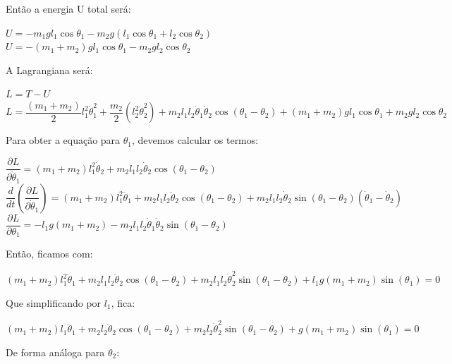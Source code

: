 \documentclass[13pt,a4paper]{report}
\begin{document}
Então a energia U total será:
\begin{center}
$
U = -m_{1}gl_{1}\cos\theta_{1} -m_{2}g ( l_{1}\cos\theta_{1} + l_{2}\cos\theta_{2} )
$
\\[2mm]
$
U = -(m_{1} + m_{2}) gl_{1}\cos\theta_{1} -m_{2}gl_{2}\cos\theta_{2}
$
\end{center}
A Lagrangiana será:
\begin{center}
$
L = T - U
$
\\[2mm]
$
L = \dfrac{(m_{1} + m_{2})}{2}l_{1}^{2}\dot{\theta}_{1}^{2} 
	+ \dfrac{m_{2}}{2}\left( l_{2}^{2}\dot{\theta}_{2}^{2} \right)
	+ m_{2}l_{1}l_{2}\dot{\theta}_{1}\dot{\theta}_{2}\cos\left(\theta_{1} - \theta_{2}\right)
	+ \left(m_{1} + m_{2}\right)gl_{1}\cos\theta_{1}
	+ m_{2}gl_{2}\cos\theta_{2}
$
\end{center}
\clearpage
Para obter a equação para $\theta_{1}$, devemos calcular os termos:
\begin{center}
$
\dfrac{\partial L}{\partial\dot{\theta}_{1}} =
\left(m_{1} + m_{2}\right)l_{1}^{2}\dot{\theta}_{2}
+ m_{2}l_{1}l_{2}\dot{\theta}_{2}\cos\left(\theta_{1} - \theta_{2}\right)
$
\\[2mm]
$
\dfrac{d}{dt}\left( \dfrac{\partial L}{\partial\dot{\theta}_{1}} \right) =
\left(m_{1} + m_{2}\right)l_{1}^{2}\ddot{\theta}_{1}
+ m_{2}l_{1}l_{2}\ddot{\theta}_{2}\cos\left(\theta_{1} - \theta_{2}\right)
+ m_{2}l_{1}l_{2}\dot{\theta}_{2}\sin\left(\theta_{1} - \theta_{2}\right)\left(\dot{\theta}_{1} - \dot{\theta}_{2} \right)
$
\\[2mm]
$
\dfrac{\partial L}{\partial\theta_{1}} = -l_{1}g\left(m_{1} + m_{2} \right)
-m_{2}l_{1}l_{2}\dot{\theta}_{1}\dot{\theta}_{2}\sin\left(\theta_{1} - \theta_{2}\right)
$
\end{center}
Então, ficamos com:
\begin{center}
$
\left(m_{1} + m_{2}\right)l_{1}^{2}\ddot{\theta}_{1}
+ m_{2}l_{1}l_{2}\ddot{\theta}_{2}\cos\left(\theta_{1} - \theta_{2}\right)
+m_{2}l_{1}l_{2}\dot{\theta}_{2}^{2}\sin\left(\theta_{1} - \theta_{2}\right)
+l_{1}g\left(m_{1} + m_{2}\right)\sin\left(\theta_{1}\right) = 0
$
\end{center}
Que simplificando por $l_{1}$, fica:
\begin{center}
$
\left(m_{1} + m_{2}\right)l_{1}\ddot{\theta}_{1}
+ m_{2}l_{2}\ddot{\theta}_{2}\cos\left(\theta_{1} - \theta_{2}\right)
+m_{2}l_{2}\dot{\theta}_{2}^{2}\sin\left(\theta_{1} - \theta_{2}\right)
+g\left(m_{1} + m_{2}\right)\sin\left(\theta_{1}\right) = 0
$
\end{center}
De forma análoga para $\theta_{2}$:
\end{document}
